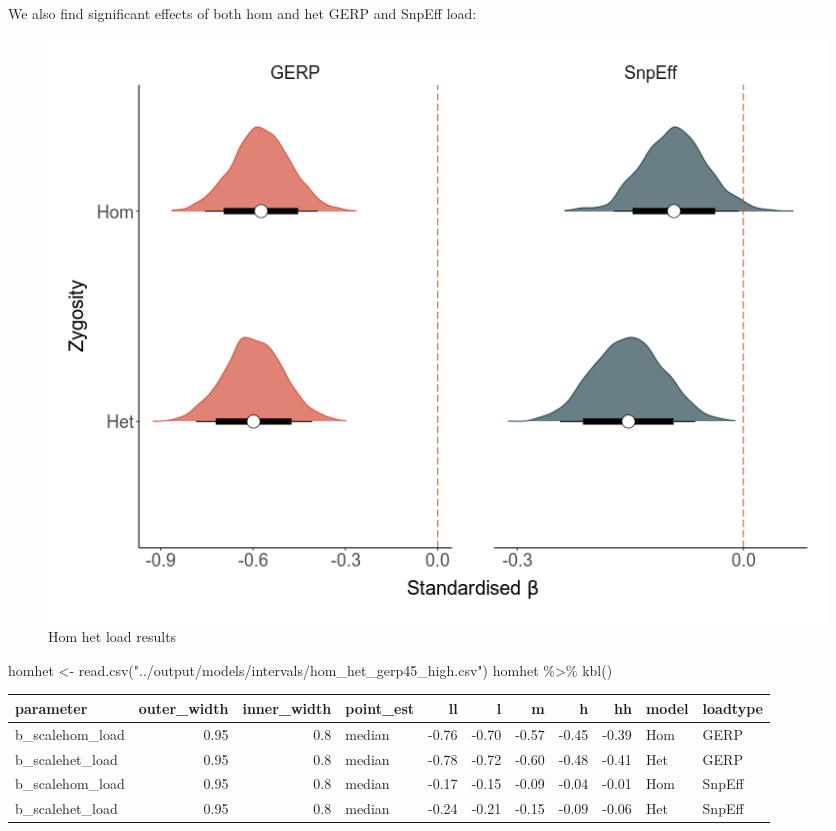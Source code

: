 \documentclass[
  letterpaper,
  DIV=11,
  numbers=noendperiod]{scrreprt}
\newenvironment{Shaded}{}{}
\newcommand{\FunctionTok}[1]{\textcolor[rgb]{0.44,0.26,0.76}{#1}}
\newcommand{\NormalTok}[1]{\textcolor[rgb]{0.14,0.16,0.18}{#1}}
\newcommand{\OtherTok}[1]{\textcolor[rgb]{0.44,0.26,0.76}{#1}}
\newcommand{\SpecialCharTok}[1]{\textcolor[rgb]{0.00,0.36,0.77}{#1}}
\newcommand{\StringTok}[1]{\textcolor[rgb]{0.01,0.18,0.38}{#1}}
\begin{document}
We also find significant effects of both hom and het GERP and SnpEff
load:

\begin{figure}

{\centering \includegraphics{qmd/../plots/main/fig_2b.png}

}

\caption{Hom het load results}

\end{figure}

\begin{Shaded}
\begin{Highlighting}[]
\NormalTok{homhet }\OtherTok{\textless{}{-}} \FunctionTok{read.csv}\NormalTok{(}\StringTok{"../output/models/intervals/hom\_het\_gerp45\_high.csv"}\NormalTok{)}
\NormalTok{homhet }\SpecialCharTok{\%\textgreater{}\%} \FunctionTok{kbl}\NormalTok{() }
\end{Highlighting}
\end{Shaded}

\begin{tabular}[t]{l|r|r|l|r|r|r|r|r|l|l}
\hline
parameter & outer\_width & inner\_width & point\_est & ll & l & m & h & hh & model & loadtype\\
\hline
b\_scalehom\_load & 0.95 & 0.8 & median & -0.76 & -0.70 & -0.57 & -0.45 & -0.39 & Hom & GERP\\
\hline
b\_scalehet\_load & 0.95 & 0.8 & median & -0.78 & -0.72 & -0.60 & -0.48 & -0.41 & Het & GERP\\
\hline
b\_scalehom\_load & 0.95 & 0.8 & median & -0.17 & -0.15 & -0.09 & -0.04 & -0.01 & Hom & SnpEff\\
\hline
b\_scalehet\_load & 0.95 & 0.8 & median & -0.24 & -0.21 & -0.15 & -0.09 & -0.06 & Het & SnpEff\\
\hline
\end{tabular}
\end{document}

